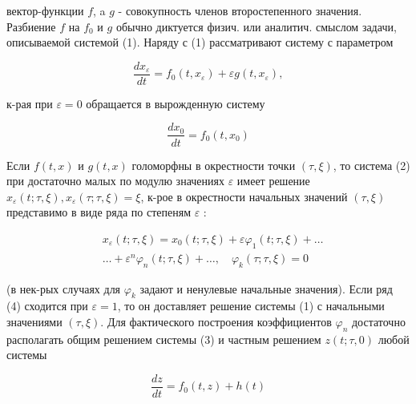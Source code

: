 \documentclass[10pt]{article}
\begin{document}
вектор-функции $f$, a $g$ - совокупность членов второстепенного значения. Разбиение $f$ на $f_{0}$ и $g$ обычно диктуется физич. или аналитич. смыслом задачи, описываемой системой (1). Наряду с (1) рассматривают систему с параметром



\[

\frac{d x_{\varepsilon}}{d t}=f_{0}\left(t, x_{\varepsilon}\right)+\varepsilon g\left(t, x_{\varepsilon}\right),

\]



к-рая при $\varepsilon=0$ обращается в вырожденную систему



\[

\frac{d x_{0}}{d t}=f_{0}\left(t, x_{0}\right)

\]



Если $f(t, x)$ и $g(t, x)$ голоморфны в окрестности точки $(\tau, \xi)$, то система (2) при достаточно малых по модулю значениях $\varepsilon$ имеет решение $x_{\varepsilon}(t ; \tau, \xi), x_{\varepsilon}(\tau ; \tau, \xi)=\xi$, к-рое в окрестности начальных значений $(\tau, \xi)$ представимо в виде ряда по степеням $\varepsilon$ :



\[

\begin{aligned}

& x_{\varepsilon}(t ; \tau, \xi)=x_{0}(t ; \tau, \xi)+\varepsilon \varphi_{1}(t ; \tau, \xi)+\ldots \\

& \ldots+\varepsilon^{n} \varphi_{n}(t ; \tau, \xi)+\ldots, \quad \varphi_{k}(\tau ; \tau, \xi)=0

\end{aligned}

\]



(в нек-рых случаях для $\varphi_{k}$ задают и ненулевые начальные значения). Если ряд (4) сходится при $\varepsilon=1$, то он доставляет решение системы (1) с начальными значениями $(\tau, \xi)$. Для фактического построения коэффициентов $\varphi_{n}$ достаточно располагать общим решением системы (3) и частным решением $z(t ; \tau, 0)$ любой системы



\[

\frac{d z}{d t}=f_{0}(t, z)+h(t)

\]
\end{document}

